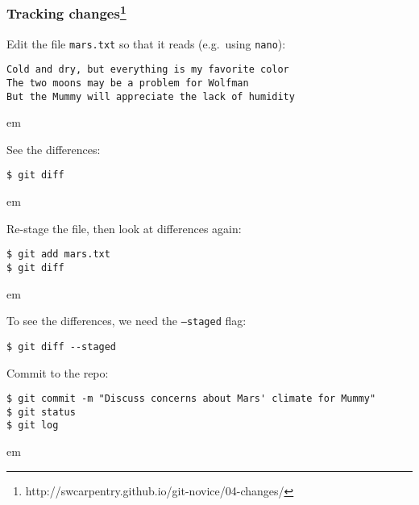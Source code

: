 \documentclass[aspectratio=1610]{beamer}
\begin{document}
\begin{frame}
{\begin{minipage}{\textwidth}
  \end{minipage}
  }

\end{frame}

\begin{frame}[fragile]
  \frametitle{Tracking changes\footnote{http://swcarpentry.github.io/git-novice/04-changes/}}

Edit the file \texttt{mars.txt} so that it reads (e.g.~using \texttt{nano}):
\begin{verbatim}
Cold and dry, but everything is my favorite color
The two moons may be a problem for Wolfman
But the Mummy will appreciate the lack of humidity
\end{verbatim}
 em
\pause

See the differences:
\begin{verbatim}
$ git diff
\end{verbatim}
 em
\pause

Re-stage the file, then look at differences again:
\begin{verbatim}
$ git add mars.txt
$ git diff
\end{verbatim}
 em
\pause

To see the differences, we need the \texttt{--staged} flag:
\begin{verbatim}
$ git diff --staged
\end{verbatim}

\end{frame}

\begin{frame}[fragile]

Commit to the repo:
\begin{verbatim}
$ git commit -m "Discuss concerns about Mars' climate for Mummy"
$ git status
$ git log
\end{verbatim}
 em
\pause

\end{frame}
\end{document}
